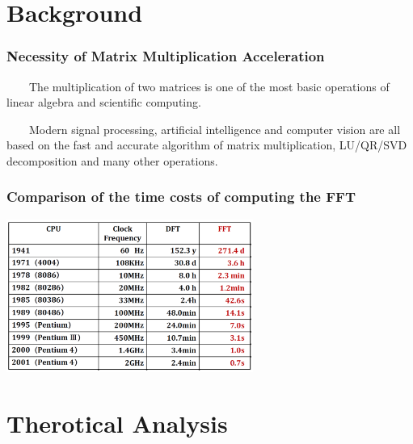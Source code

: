 \documentclass[cjk]{beamer}
\begin{document}
\section{Background}
\begin{frame}
  \frametitle{\textbf{Necessity of Matrix Multiplication Acceleration}}
  \vspace{5mm}
  \small
  ~~~~The multiplication of two matrices is one of the most basic operations of linear algebra and scientific computing.

  ~~~~Modern signal processing, artificial intelligence and computer vision are all based on the fast and accurate algorithm of matrix multiplication, LU/QR/SVD decomposition and many other operations.

\end{frame}
\begin{frame}
  \frametitle{\textbf{Comparison of the time costs of computing the FFT}}

  \includegraphics[height=5.0cm]{fftvel.png}

\end{frame}


\section{Therotical Analysis}
\end{document}
